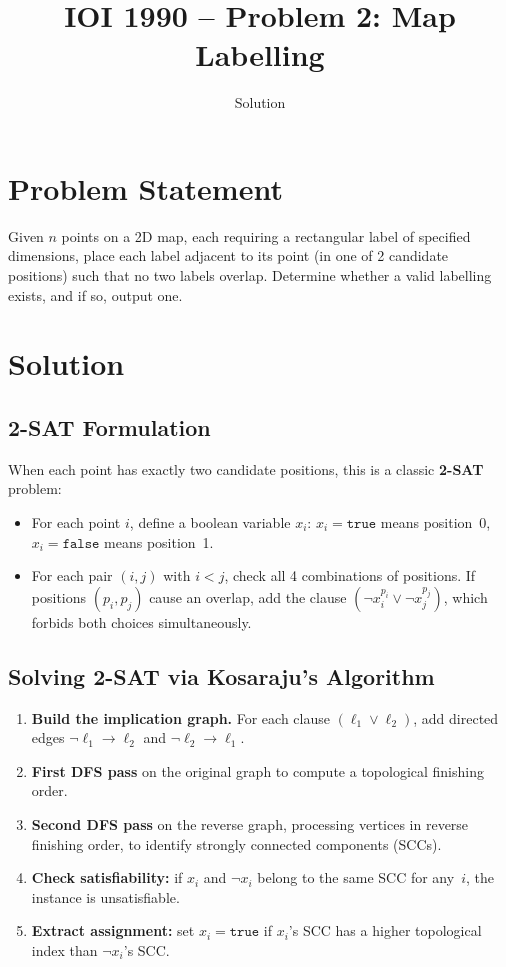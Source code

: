 \documentclass[11pt,a4paper]{article}
\title{IOI 1990 -- Problem 2: Map Labelling}
\author{Solution}
\date{}
\begin{document}
\maketitle

\section{Problem Statement}

Given $n$ points on a 2D map, each requiring a rectangular label of specified
dimensions, place each label adjacent to its point (in one of 2 candidate
positions) such that no two labels overlap. Determine whether a valid
labelling exists, and if so, output one.

\section{Solution}

\subsection{2-SAT Formulation}

When each point has exactly two candidate positions, this is a classic
\textbf{2-SAT} problem:

\begin{itemize}
  \item For each point $i$, define a boolean variable $x_i$:
    $x_i = \texttt{true}$ means position~0, $x_i = \texttt{false}$ means
    position~1.
  \item For each pair $(i, j)$ with $i < j$, check all 4 combinations
    of positions. If positions $(p_i, p_j)$ cause an overlap, add the
    clause $(\neg x_i^{p_i} \lor \neg x_j^{p_j})$, which forbids both
    choices simultaneously.
\end{itemize}

\subsection{Solving 2-SAT via Kosaraju's Algorithm}

\begin{enumerate}
  \item \textbf{Build the implication graph.} For each clause
    $(\ell_1 \lor \ell_2)$, add directed edges $\neg\ell_1 \to \ell_2$
    and $\neg\ell_2 \to \ell_1$.
  \item \textbf{First DFS pass} on the original graph to compute a
    topological finishing order.
  \item \textbf{Second DFS pass} on the reverse graph, processing vertices
    in reverse finishing order, to identify strongly connected components
    (SCCs).
  \item \textbf{Check satisfiability:} if $x_i$ and $\neg x_i$ belong to
    the same SCC for any~$i$, the instance is unsatisfiable.
  \item \textbf{Extract assignment:} set $x_i = \texttt{true}$ if $x_i$'s
    SCC has a higher topological index than $\neg x_i$'s SCC.
\end{enumerate}
\end{document}
